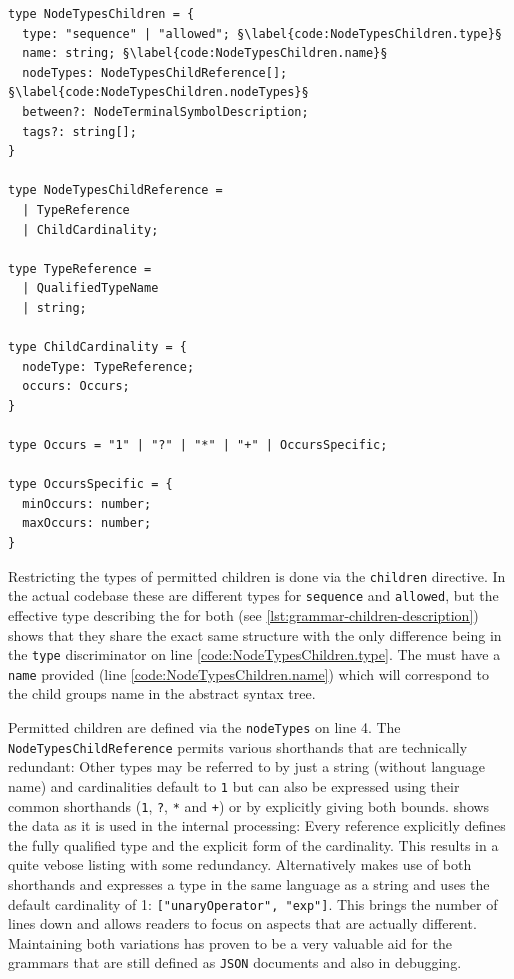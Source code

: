 \documentclass[]{report}
\begin{document}
\begin{listing}[H]
\begin{verbatim}
type NodeTypesChildren = {
  type: "sequence" | "allowed"; §\label{code:NodeTypesChildren.type}§
  name: string; §\label{code:NodeTypesChildren.name}§
  nodeTypes: NodeTypesChildReference[]; §\label{code:NodeTypesChildren.nodeTypes}§
  between?: NodeTerminalSymbolDescription;
  tags?: string[];
}

type NodeTypesChildReference =
  | TypeReference
  | ChildCardinality;

type TypeReference =
  | QualifiedTypeName
  | string;

type ChildCardinality = {
  nodeType: TypeReference;
  occurs: Occurs;
}

type Occurs = "1" | "?" | "*" | "+" | OccursSpecific;

type OccursSpecific = {
  minOccurs: number;
  maxOccurs: number;
}
\end{verbatim}
\caption{Type definitions of \texttt{children} specification with \texttt{allowed} and \texttt{sequence}}
\label{lst:grammar-children-description}
\end{listing}

Restricting the types of permitted children is done via the \texttt{children} directive. In the actual codebase these are different types for \texttt{sequence} and \texttt{allowed}, but the effective type describing the for both (see \cref{lst:grammar-children-description}) shows that they share the exact same structure with the only difference being in the \texttt{type} discriminator on line \ref{code:NodeTypesChildren.type}. The must have a \texttt{name} provided (line \ref{code:NodeTypesChildren.name}) which will correspond to the child groups name in the abstract syntax tree.

Permitted children are defined via the \texttt{nodeTypes} on line 4. The \texttt{NodeTypesChildReference} permits various shorthands that are technically redundant: Other types may be referred to by just a string (without language name) and cardinalities default to \texttt{1} but can also be expressed using their common shorthands (\texttt{1}, \texttt{?}, \texttt{*} and \texttt{+}) or by explicitly giving both bounds.  shows the data as it is used in the internal processing: Every reference explicitly defines the fully qualified type and the explicit form of the cardinality. This results in a quite vebose listing with some redundancy. Alternatively  makes use of both shorthands and expresses a type in the same language as a string and uses the default cardinality of 1: \texttt{["unaryOperator", "exp"]}. This brings the number of lines down and allows readers to focus on aspects that are actually different. Maintaining both variations has proven to be a very valuable aid for the grammars that are still defined as \texttt{JSON} documents and also in debugging.
\end{document}
